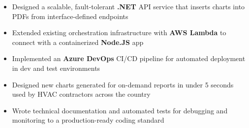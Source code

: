 \begin{itemize}
    \item Designed a scalable, fault-tolerant \textbf{.NET} API service that inserts charts into PDFs from interface-defined endpoints
    \item Extended existing orchestration infrastructure with \textbf{AWS Lambda} to connect with a containerized \textbf{Node.JS} app
    \item Implemented an \textbf{Azure DevOps} CI/CD pipeline for automated deployment in dev and test environments
    \item Designed new charts generated for on-demand reports in under 5 seconds used by HVAC contractors across the country
    \item Wrote technical documentation and automated tests for debugging and monitoring to a production-ready coding standard
\end{itemize}
